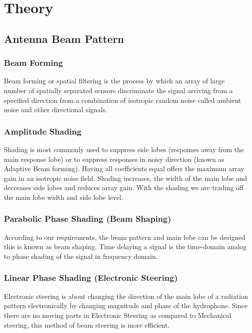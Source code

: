 \chapter*{Theory}

\section{ Antenna Beam Pattern } \label{ Antenna Beam Pattern }
\noindent

\subsection{ Beam Forming } \label{ Beam Forming} 
\noindent Beam forming or spatial filtering is the process by which an array of large number of spatially separated sensors discriminate the signal arriving from a specified direction from a combination of isotropic random noise called ambient noise and other directional signals.

\subsection{ Amplitude Shading } \label{ Amplitude Shading } 
\noindent Shading is most commonly used to suppress side lobes (responses away from the main response lobe) or to suppress responses in noisy direction (known as Adaptive Beam forming). Having all coefficients equal offers the maximum array gain in an isotropic noise field. Shading increases, the width of the main lobe and decreases side lobes and reduces array gain. With the shading we are trading off the main lobe width and side lobe level.

\subsection{ Parabolic Phase Shading (Beam Shaping) } \label{ Parabolic Phase Shading (Beam Shaping) } 
\noindent According to our requirements, the beam pattern and main lobe can be designed this is known as beam shaping. Time delaying a signal is the time-domain analog to phase shading of the signal in frequency domain.

\subsection{ Linear Phase Shading (Electronic Steering) } \label{ Linear Phase Shading (Electronic Steering) } 
\noindent Electronic steering is about changing the direction of the main lobe of a radiation pattern electronically by changing magnitude and phase of the hydrophone. Since there are no moving parts in Electronic Steering as compared to Mechanical steering, this method of beam steering is more efficient.


